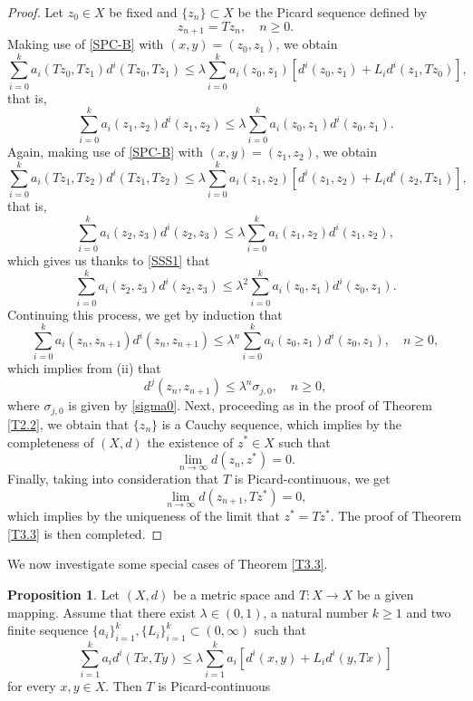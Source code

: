 \documentclass[letterpaper,12pt]{article}
\numberwithin{equation}{section}
\theoremstyle{definition}
\newtheorem{proposition}[theorem]{Proposition}
\theoremstyle{remark}
\begin{document}
\begin{proof}
Let $z_0\in X$ be fixed and  $\{z_n\}\subset X$ be the Picard sequence defined by  
$$
z_{n+1}=Tz_n,\quad  n\geq 0.
$$
Making use of \eqref{SPC-B} with $(x,y)=(z_0,z_1)$, we obtain
$$
\sum_{i=0}^ka_i(Tz_0,Tz_1)d^i(Tz_0,Tz_1)\leq \lambda \sum_{i=0}^k a_i(z_0,z_1)\left[d^i(z_0,z_1)+L_id^i(z_1,Tz_0)\right],			
$$
that is,
\begin{equation}\label{SSS1}
\sum_{i=0}^ka_i(z_1,z_2)d^i(z_1,z_2)\leq \lambda \sum_{i=0}^k a_i(z_0,z_1)d^i(z_0,z_1).
\end{equation}
Again, making use of \eqref{SPC-B} with $(x,y)=(z_1,z_2)$, we obtain
$$
\sum_{i=0}^ka_i(Tz_1,Tz_2)d^i(Tz_1,Tz_2)\leq \lambda \sum_{i=0}^k a_i(z_1,z_2)\left[d^i(z_1,z_2)+L_id^i(z_2,Tz_1)\right],			
$$
that is,
$$
\sum_{i=0}^ka_i(z_2,z_3)d^i(z_2,z_3)\leq \lambda \sum_{i=0}^k a_i(z_1,z_2)d^i(z_1,z_2),
$$
which gives us thanks to \eqref{SSS1} that 
$$
\sum_{i=0}^ka_i(z_2,z_3)d^i(z_2,z_3)\leq \lambda^2 \sum_{i=0}^k a_i(z_0,z_1)d^i(z_0,z_1).
$$
Continuing this process, we get by induction that 
$$
\sum_{i=0}^ka_i(z_n,z_{n+1})d^i(z_n,z_{n+1})\leq \lambda^n \sum_{i=0}^k a_i(z_0,z_1)d^i(z_0,z_1),\quad n\geq 0,
$$
which implies from (ii) that 
$$
d^j(z_n,z_{n+1})\leq  \lambda^n \sigma_{j,0},\quad n\geq 0,	
$$
where $\sigma_{j,0}$ is given by \eqref{sigma0}. Next, proceeding as in the proof of Theorem \ref{T2.2}, we obtain that $\{z_n\}$ is a Cauchy sequence, which implies by the completeness of $(X,d)$ the existence of $z^*\in X$ such that 
$$
\lim_{n\to \infty}d(z_n,z^*)=0. 
$$
Finally, taking into consideration that $T$ is Picard-continuous, we get 
$$
\lim_{n\to \infty}d(z_{n+1},Tz^*)=0,
$$
which implies by the uniqueness of the limit that $z^*=Tz^*$. The proof of Theorem \ref{T3.3} is then completed. 
\end{proof}

We now investigate some special cases of Theorem \ref{T3.3}. 

\begin{proposition}\label{PP}
Let $(X,d)$ be a metric space and $T: X\to X$ be a given mapping. Assume that there exist $\lambda\in (0,1)$, a natural number $k\geq 1$ and two finite sequence $\{a_i\}_{i=1}^k, \{L_i\}_{i=1}^k\subset (0,\infty)$ such that 
\begin{equation}\label{CT-CR3.3}
\sum_{i=1}^ka_id^i(Tx,Ty)\leq \lambda \sum_{i=1}^k a_i\left[d^i(x,y)+L_id^i(y,Tx)\right]
\end{equation}
for every $x,y\in X$. Then $T$ is Picard-continuous  	
\end{proposition}
\end{document}

